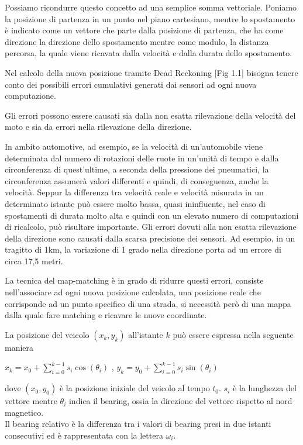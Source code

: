 \documentclass[12pt,a4paper,openright,twoside]{report}
\begin{document}
Possiamo ricondurre questo concetto ad una semplice somma vettoriale. Poniamo la posizione di partenza in un punto nel piano cartesiano, mentre lo spostamento è indicato come un vettore che parte dalla posizione di partenza, che ha come direzione la direzione dello spostamento mentre come modulo, la distanza percorsa, la quale viene ricavata dalla velocità e dalla durata dello spostamento.

Nel calcolo della nuova posizione tramite Dead Reckoning [Fig 1.1] bisogna tenere conto dei possibili errori cumulativi generati dai sensori ad ogni nuova computazione. 

Gli errori possono essere causati sia dalla non esatta rilevazione della velocità del moto e sia da errori nella rilevazione della direzione.

In ambito automotive, ad esempio, se la velocità di un'automobile viene determinata dal numero di rotazioni delle ruote in un'unità di tempo e dalla circonferenza di quest'ultime, a seconda della pressione dei pneumatici, la circonferenza assumerà valori differenti e quindi, di conseguenza, anche la velocità. 
Seppur la differenza tra velocità reale e velocità misurata in un determinato istante può essere molto bassa, quasi ininfluente, nel caso di spostamenti di durata molto alta e quindi con un elevato numero di computazioni di ricalcolo, può risultare importante.
Gli errori dovuti alla non esatta rilevazione della direzione sono causati dalla scarsa precisione dei sensori. Ad esempio, in un tragitto di 1km, la variazione di 1 grado nella direzione porta ad un errore di circa 17,5 metri.


La tecnica del map-matching \cite{K7} è in grado di ridurre questi errori, consiste nell'associare ad ogni nuova posizione calcolata, una posizione reale che corrisponde ad un punto specifico di una strada, si necessità però di una mappa dalla quale fare matching e ricavare le nuove coordinate.

La posizione del veicolo $(x_k, y_k)$ all'istante $k$ può essere espressa nella seguente maniera \cite{K8}
\begin{center}
$x_k = x_0 + \sum_{i=0}^{k-1} s_i  \cos( \theta_i) $ ,      $y_k = y_0 + \sum_{i=0}^{k-1} s_i  \sin( \theta_i)  $
\end{center}
dove $(x_0, y_0)$ è la posizione iniziale del veicolo al tempo $t_0 $. $s_i$ è la lunghezza del vettore mentre $ \theta_i $ indica il bearing, ossia la direzione del vettore rispetto al nord magnetico.\\
Il bearing relativo è la differenza tra i valori di bearing presi in due istanti consecutivi ed è rappresentata con la lettera $\omega_i $.
\end{document}
